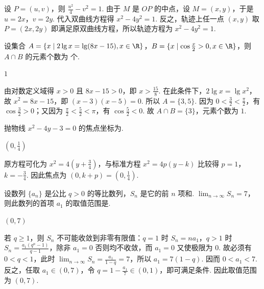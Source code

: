 \begin{solution}
设 \(P=(u,v)\)，则 \(\frac{u^2}{4}-v^2=1\). 由于 \(M\) 是 \(OP\) 的中点，设 \(M=(x,y)\)，于是 \(u=2x\)，\(v=2y\). 代入双曲线方程得 \(x^2-4y^2=1\). 反之，轨迹上任一点 \((x,y)\) 取 \(P=(2x,2y)\) 即满足原双曲线方程，所以轨迹方程为 \(x^2-4y^2=1\).
\end{solution}

\begin{problem}
设集合 \(A=\{x\mid2\lg x=\lg(8x-15),x\in\R\}\)，\(B=\{x\mid\cos\frac{x}{2}>0,x\in\R\}\)，则 \(A\cap B\) 的元素个数为\fillinblank{} 个.
\end{problem}

\begin{answer}
\(1\)
\end{answer}

\begin{solution}
由对数定义域得 \(x>0\) 且 \(8x-15>0\)，即 \(x>\frac{15}{8}\). 在此条件下，\(2\lg x=\lg x^2\)，故 \(x^2=8x-15\)，即 \((x-3)(x-5)=0\). 所以 \(A=\{3,5\}\). 因为 \(0<\frac32<\frac\pi2\)，有 \(\cos\frac32>0\)；又因为 \(\frac\pi2<\frac52<\pi\)，有 \(\cos\frac52<0\). 故 \(A\cap B=\{3\}\)，元素个数为 \(1\).
\end{solution}

\begin{problem}
抛物线 \(x^2-4y-3=0\) 的焦点坐标为\fillinblank{}.
\end{problem}

\begin{answer}
\(\left(0,\frac14\right)\)
\end{answer}

\begin{solution}
原方程可化为 \(x^2=4\left(y+\frac34\right)\)，与标准方程 \(x^2=4p(y-k)\) 比较得 \(p=1\)，\(k=-\frac34\). 因此焦点为 \((0,k+p)=\left(0,\frac14\right)\).
\end{solution}

\begin{problem}
设数列 \(\{a_n\}\) 是公比 \(q>0\) 的等比数列，\(S_n\) 是它的前 \(n\) 项和. \(\displaystyle\lim_{n\to\infty}S_n=7\)，则此数列的首项 \(a_1\) 的取值范围是\fillinblank{}.
\end{problem}

\begin{answer}
\((0,7)\)
\end{answer}

\begin{solution}
若 \(q\geqslant1\)，则 \(S_n\) 不可能收敛到非零有限值：\(q=1\) 时 \(S_n=na_1\)，\(q>1\) 时 \(S_n=\frac{a_1(q^n-1)}{q-1}\)，除非 \(a_1=0\) 否则均不收敛，而 \(a_1=0\) 又使极限为 \(0\). 故必须有 \(0<q<1\)，此时 \(\displaystyle\lim_{n\to\infty}S_n=\frac{a_1}{1-q}=7\)，所以 \(a_1=7(1-q)\). 因而 \(0<a_1<7\). 反之，任取 \(a_1\in(0,7)\)，令 \(q=1-\frac{a_1}{7}\in(0,1)\)，即可满足条件. 因此取值范围为 \((0,7)\).
\end{solution}

